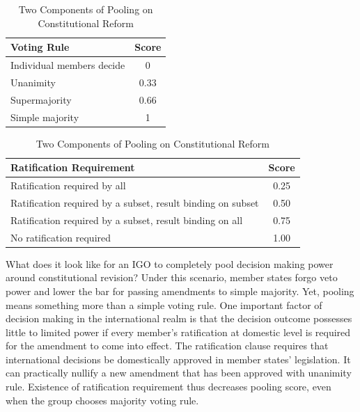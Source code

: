 \documentclass[12pt]{article}
\begin{document}
\begin{table}[H]
\centering
\caption{Two Components of Pooling on Constitutional Reform}
\label{tab:pooling}
\small
\begin{minipage}{0.38\textwidth}
\centering
\begin{tabular}{lc}
\toprule
\textbf{Voting Rule} & \textbf{Score} \\
\midrule
Individual members decide & 0 \\
Unanimity & 0.33 \\
Supermajority & 0.66 \\
Simple majority & 1 \\
\bottomrule
\end{tabular}
\end{minipage}
\hspace{0.2em}
\begin{minipage}{0.60\textwidth}
\centering
\begin{tabular}{lc}
\toprule
\textbf{Ratification Requirement} & \textbf{Score} \\
\midrule
Ratification required by all & 0.25 \\
Ratification required by a subset, result binding on subset & 0.50 \\
Ratification required by a subset, result binding on all & 0.75 \\
No ratification required & 1.00 \\
\bottomrule
\end{tabular}
\end{minipage}
\end{table}

What does it look like for an IGO to completely pool decision making power around constitutional revision? Under this scenario, member states forgo veto power and lower the bar for passing amendments to simple majority. Yet, pooling means something more than a simple voting rule. One important factor of decision making in the international realm is that the decision outcome possesses little to limited power if every member's ratification at domestic level is required for the amendment to come into effect. The ratification clause requires that international decisions be domestically approved in member states' legislation. It can practically nullify a new amendment that has been approved with unanimity rule. Existence of ratification requirement thus decreases pooling score, even when the group chooses majority voting rule.
\end{document}
